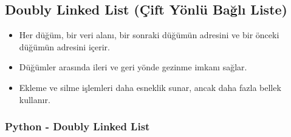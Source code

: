 \newpage

\subsection{Doubly Linked List (Çift Yönlü Bağlı Liste)}

\begin{itemize}
    \item Her düğüm, bir veri alanı, bir sonraki düğümün adresini ve bir önceki düğümün adresini içerir.
    \item Düğümler arasında ileri ve geri yönde gezinme imkanı sağlar.
    \item Ekleme ve silme işlemleri daha esneklik sunar, ancak daha fazla bellek kullanır.
\end{itemize}

\subsubsection{Python - Doubly Linked List}

